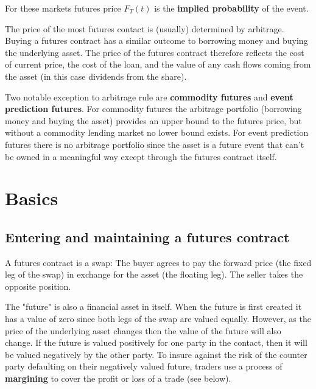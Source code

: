 \documentclass{tran-l}
\theoremstyle{definition}
\theoremstyle{remark}
\numberwithin{equation}{subsection}
\begin{document}

For these markets futures price $F_T(t)$ is the \textbf{implied probability} of the event.


The price of the most futures contact is (usually) determined by arbitrage. Buying a futures contract has a similar outcome to borrowing money and buying the underlying asset. The price of the futures contract therefore reflects the cost of current price, the cost of the loan, and the value of any cash flows coming from the asset (in this case dividends from the share).

Two notable exception to arbitrage rule are \textbf{commodity futures} and \textbf{event prediction futures}. For commodity futures the arbitrage portfolio (borrowing money and buying the asset) provides an upper bound to the futures price, but without a commodity lending market no lower bound exists. For event prediction futures there is no arbitrage portfolio since the asset is a future event that can't be owned in a meaningful way except through the futures contract itself.  


\section{Basics}

\subsection{Entering and maintaining a futures contract}

A futures contract is a swap: The buyer agrees to pay the forward price (the fixed leg of the swap) in exchange for the asset (the floating leg). The seller takes the opposite position. 

The "future" is also a financial asset in itself. When the future is first created it has a value of zero since both legs of the swap are valued equally. However, as the price of the underlying asset changes then the value of the future will also change. If the future is valued positively for one party in the contact, then it will be valued negatively by the other party. To insure against the risk of the counter party defaulting on their negatively valued future, traders use  a process of \textbf{margining} to cover the profit or loss of a trade (see below). 
\end{document}
